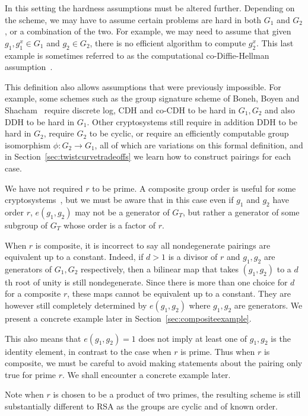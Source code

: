In this setting the hardness assumptions must be altered further. Depending on
the scheme, we may have to assume certain problems are hard in both $G_1$ and
$G_2$, or a combination of the two. For example, we may need to assume that
given $g_1, g_1^x \in G_1$ and $g_2 \in G_2$, there is no efficient algorithm
to compute $g_2^x$. This last example is sometimes referred to as the
computational co-Diffie-Hellman assumption~\cite{bls}.

This definition also allows assumptions that were previously impossible. For
example, some schemes such as the group signature scheme of Boneh, Boyen and
Shacham~\cite{bbs} require discrete log, CDH and co-CDH to be hard in $G_1,
G_2$ and also DDH to be hard in $G_1$. Other cryptosystems still require in
addition DDH to be hard in $G_2$, require $G_2$ to be cyclic, or require an
efficiently computable group isomorphism $\phi:G_2 \rightarrow G_1$, all of
which are variations on this formal definition, and in
Section~\ref{sec:twistcurvetradeoffs} we learn how to construct pairings for
each case.

We have not required $r$ to be prime. A composite group order is useful for
some cryptosystems~\cite{bgn}, but we must be aware that in this case even if
$g_1$ and $g_2$ have order $r$, $e(g_1, g_2)$ may not be a generator of $G_T$,
but rather a generator of some subgroup of $G_T$ whose order is a factor of
$r$.

When $r$ is composite, it is incorrect to say all nondegenerate pairings are
equivalent up to a constant. Indeed, if $d > 1$ is a divisor of $r$
and $g_1, g_2$ are generators of $G_1, G_2$ respectively, then a bilinear map
that takes $(g_1, g_2)$ to a $d$th root of unity is still nondegenerate.
Since there is more than one choice for $d$ for a composite $r$,
these maps cannot be equivalent up to a constant. They are however still
completely determined by $e(g_1, g_2)$ where $g_1, g_2$ are generators.
We present a concrete example later in Section~\ref{sec:compositeexample}.

This also means that $e(g_1, g_2) = 1$ does not imply at least
one of $g_1, g_2$ is the identity element, in contrast to the case when
$r$ is prime. Thus when $r$ is composite, we must be careful to avoid
making statements about the pairing only true for prime $r$.
We shall encounter a concrete example later.

Note when $r$ is chosen to be a product of two primes, the resulting scheme
is still substantially different to RSA as the groups are cyclic and of
known order.

